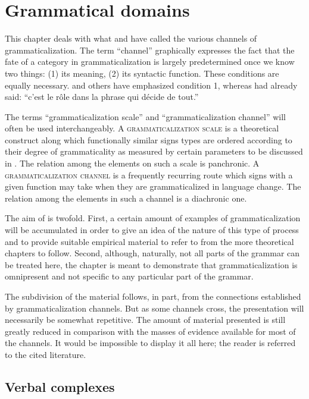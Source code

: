 \chapter{Grammatical domains} \label{chap:3}

This chapter deals with what \citet{Givón1979b} and \citet{HeineEtAl1984} have called the various channels of grammaticalization. The term ``channel'' graphically expresses the fact that the fate of a category in grammaticalization is largely predetermined once we know two things: (1) its meaning, (2) its syntactic function. These conditions are equally necessary. \citet[213f]{Givón1979a} and others have emphasized condition 1, whereas \citet[170]{Meillet1915} had already said: “c'est le rôle dans la phrase qui décide de tout.”

The terms ``grammaticalization scale'' and ``grammaticalization channel'' will often be used interchangeably. A \textsc{grammaticalization scale} is a theoretical construct along which functionally similar signs types are ordered according to their degree of grammaticality as measured by certain parameters to be discussed in . The relation among the elements on such a scale is panchronic. A \textsc{gram\-maticalization channel} is a frequently recurring route which signs with a given function may take when they are grammaticalized in language change. The relation among the elements in such a channel is a diachronic one.

The aim of  is twofold. First, a certain amount of examples of grammaticalization will be accumulated in order to give an idea of the nature of this type of process and to provide suitable empirical material to refer to from the more theoretical chapters to follow. Second, although, naturally, not all parts of the grammar can be treated here, the chapter is meant to demonstrate that grammaticalization is omnipresent and not specific to any particular part of the grammar.

The subdivision of the material follows, in part, from the connections established by grammaticalization channels. But as some channels cross, the presentation will necessarily be somewhat repetitive. The amount of material presented is still greatly reduced in comparison with the masses of evidence available for most of the channels. It would be impossible to display it all here; the reader is referred to the cited literature.

\section{Verbal complexes}

